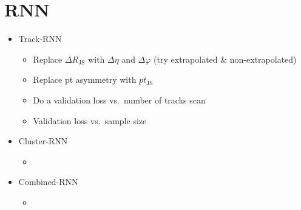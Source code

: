 \chapter{RNN}
\label{sec:rnn}

\begin{itemize}
\item Track-RNN
  \begin{itemize}
  \item Replace $\Delta R_\mathrm{JS}$ with $\Delta \eta$ and $\Delta \varphi$
    (try extrapolated \& non-extrapolated)
  \item Replace pt asymmetry with $pt_\mathrm{JS}$
  \item Do a validation loss vs.\ number of tracks scan
  \item Validation loss vs.\ sample size
  \end{itemize}

\item Cluster-RNN
  \begin{itemize}
  \item
  \end{itemize}

\item Combined-RNN
  \begin{itemize}
  \item
  \end{itemize}
\end{itemize}


